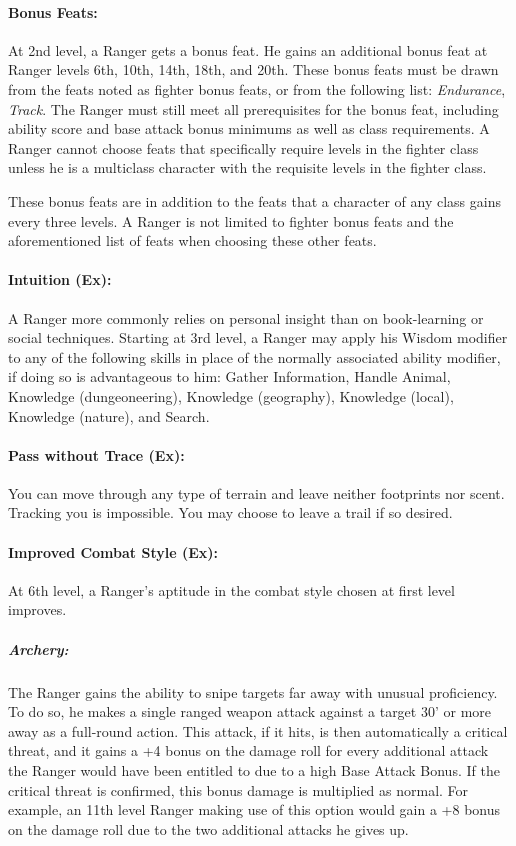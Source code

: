 \paragraph{Bonus Feats:}
At 2nd level, a Ranger gets a bonus feat.
He gains an additional bonus feat at Ranger levels 6th, 10th, 14th, 18th, and 20th. 
These bonus feats must be drawn from the feats noted as fighter bonus feats, or from the following list: \emph{Endurance}, \emph{Track}. 
The Ranger must still meet all prerequisites for the bonus feat, including ability score and base attack bonus minimums as well as class requirements. 
A Ranger cannot choose feats that specifically require levels in the fighter class unless he is a multiclass character with the requisite levels in the fighter class.

These bonus feats are in addition to the feats that a character of any class gains every three levels. 
A Ranger is not limited to fighter bonus feats and the aforementioned list of feats when choosing these other feats.
\paragraph{Intuition (Ex):}
A Ranger more commonly relies on personal insight than on book-learning or social techniques.
Starting at 3rd level, a Ranger may apply his Wisdom modifier to any of the following skills in place of the normally associated ability modifier, if doing so is advantageous to him:
Gather Information, Handle Animal, Knowledge (dungeoneering), Knowledge (geography), Knowledge (local), Knowledge (nature), and Search.

\paragraph{Pass without Trace (Ex):}
You can move through any type of terrain and leave neither footprints nor scent. Tracking you is impossible. You may choose to leave a trail if so desired.

\paragraph{Improved Combat Style (Ex):}
At 6th level, a Ranger's aptitude in the combat style chosen at first level improves.

\subparagraph{Archery:} The Ranger gains the ability to snipe targets far away with unusual proficiency.
To do so, he makes a single ranged weapon attack against a target 30' or more away as a full-round action.
This attack, if it hits, is then automatically a critical threat, and it gains a +4 bonus on the damage roll for every additional attack the Ranger would have been entitled to due to a high Base Attack Bonus. If the critical threat is confirmed, this bonus damage is multiplied as normal. 
For example, an 11th level Ranger making use of this option would gain a +8 bonus on the damage roll due to the two additional attacks he gives up.

